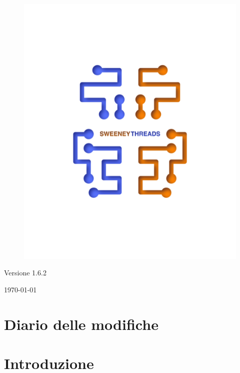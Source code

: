 \documentclass[a4paper]{article}
\begin{document}
\begin{titlepage}
		\begin{figure}[H]
			\centering
			\includegraphics[scale=0.8]{sweeney.png}
		\end{figure}
		\begin{center}
			Versione 1.6.2
		\end{center}
		{\large \today}\\[3cm] 
		\vfill  
	\end{titlepage}
	
	
	\tableofcontents
	
	\newpage 
	\section*{Diario delle modifiche}

	\newpage 
    \section{Introduzione}
\end{document}
